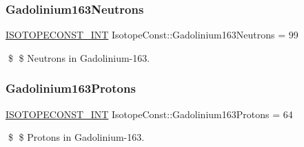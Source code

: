 \subsubsection{\texorpdfstring{Gadolinium163\+Neutrons}{Gadolinium163Neutrons}}
{\footnotesize\ttfamily \mbox{\hyperlink{group___isotope_const-_macros_ga5f18360b3e99483a35c32d789e62621c}{I\+S\+O\+T\+O\+P\+E\+C\+O\+N\+S\+T\+\_\+\+I\+NT}} Isotope\+Const\+::\+Gadolinium163\+Neutrons = 99}

\$ \$ Neutrons in Gadolinium-\/163. \mbox{\label{group___isotope_const-_gadolinium-_gd163_ga3e083b50bc430fa56d40d145f5c9a063}} 
\subsubsection{\texorpdfstring{Gadolinium163\+Protons}{Gadolinium163Protons}}
{\footnotesize\ttfamily \mbox{\hyperlink{group___isotope_const-_macros_ga5f18360b3e99483a35c32d789e62621c}{I\+S\+O\+T\+O\+P\+E\+C\+O\+N\+S\+T\+\_\+\+I\+NT}} Isotope\+Const\+::\+Gadolinium163\+Protons = 64}

\$ \$ Protons in Gadolinium-\/163. 